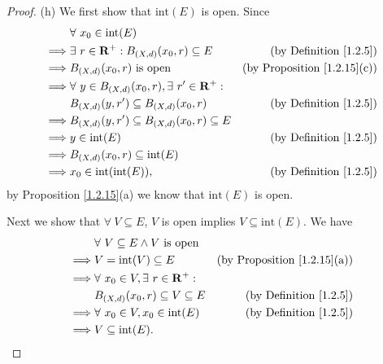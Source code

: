 \begin{proof}{(h)}
    We first show that \(\text{int}(E)\) is open.
    Since
    \begin{align*}
        & \forall\ x_0 \in \text{int}(E) \\
        \implies & \exists\ r \in \mathbf{R}^+ : B_{(X, d)}(x_0, r) \subseteq E & \text{(by Definition \ref{1.2.5})} \\
        \implies & B_{(X, d)}(x_0, r) \text{ is open} & \text{(by Proposition \ref{1.2.15}(c))} \\
        \implies & \forall\ y \in B_{(X, d)}(x_0, r), \exists\ r' \in \mathbf{R}^+ : \\
        & B_{(X, d)}(y, r') \subseteq B_{(X, d)}(x_0, r) & \text{(by Definition \ref{1.2.5})} \\
        \implies & B_{(X, d)}(y, r') \subseteq B_{(X, d)}(x_0, r) \subseteq E \\
        \implies & y \in \text{int}(E) & \text{(by Definition \ref{1.2.5})} \\
        \implies & B_{(X, d)}(x_0, r) \subseteq \text{int}(E) \\
        \implies & x_0 \in \text{int}(\text{int}(E)), & \text{(by Definition \ref{1.2.5})}
    \end{align*}
    by Proposition \ref{1.2.15}(a) we know that \(\text{int}(E)\) is open.

    Next we show that \(\forall\ V \subseteq E\), \(V\) is open implies \(V \subseteq \text{int}(E)\).
    We have
    \begin{align*}
        & \forall\ V \subseteq E \land V \text{ is open} \\
        \implies & V = \text{int}(V) \subseteq E & \text{(by Proposition \ref{1.2.15}(a))} \\
        \implies & \forall\ x_0 \in V, \exists\ r \in \mathbf{R}^+ : \\
        & B_{(X, d)}(x_0, r) \subseteq V \subseteq E & \text{(by Definition \ref{1.2.5})} \\
        \implies & \forall\ x_0 \in V, x_0 \in \text{int}(E) & \text{(by Definition \ref{1.2.5})} \\
        \implies & V \subseteq \text{int}(E).
    \end{align*}


\end{proof}
